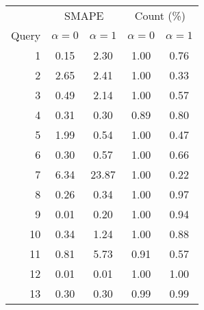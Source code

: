 \begin{tabular}{rcccc}
\toprule
      & \multicolumn{2}{c}{SMAPE}   & \multicolumn{2}{c}{Count (\%)} \\
Query & $\alpha = 0$ & $\alpha = 1$ & $\alpha = 0$ & $\alpha = 1$    \\
\midrule
    1 & 0.15         & 2.30         & 1.00         & 0.76            \\
    2 & 2.65         & 2.41         & 1.00         & 0.33            \\
    3 & 0.49         & 2.14         & 1.00         & 0.57            \\
    4 & 0.31         & 0.30         & 0.89         & 0.80            \\
    5 & 1.99         & 0.54         & 1.00         & 0.47            \\
    6 & 0.30         & 0.57         & 1.00         & 0.66            \\
    7 & 6.34         & 23.87        & 1.00         & 0.22            \\
    8 & 0.26         & 0.34         & 1.00         & 0.97            \\
    9 & 0.01         & 0.20         & 1.00         & 0.94            \\
   10 & 0.34         & 1.24         & 1.00         & 0.88            \\
   11 & 0.81         & 5.73         & 0.91         & 0.57            \\
   12 & 0.01         & 0.01         & 1.00         & 1.00            \\
   13 & 0.30         & 0.30         & 0.99         & 0.99            \\
\bottomrule
\end{tabular}
